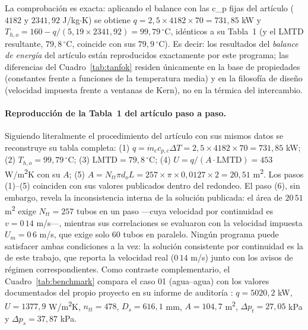 \documentclass[11pt,a4paper]{article}
\begin{document}
La comprobaci\'on es exacta: aplicando el balance con las c\_p fijas
del art\'iculo ($4182$ y $2341{,}92$ J/kg$\cdot$K) se obtiene
$q = 2{,}5\times 4182\times 70 = 731{,}85$ kW y
$T_{h,o} = 160 - q/(5{,}19\times 2341{,}92) = 99{,}79\,^{\circ}$C,
id\'enticos a su Tabla~1 (y el LMTD resultante, $79{,}8\,^{\circ}$C,
coincide con sus $79{,}9\,^{\circ}$C). Es decir: los resultados del
\emph{balance de energ\'ia} del art\'iculo est\'an reproducidos
exactamente por este programa; las diferencias del Cuadro~\ref{tab:tanfok}
residen \'unicamente en la base de propiedades (constantes frente a
funciones de la temperatura media) y en la filosof\'ia de dise\~no
(velocidad impuesta frente a ventanas de Kern), no en la t\'ermica del
intercambio.

\paragraph{Reproducci\'on de la Tabla~1 del art\'iculo paso a paso.}
Siguiendo literalmente el procedimiento del art\'iculo con sus mismos
datos se reconstruye su tabla completa: (1) $q = \dot m_c c_{p,c}\Delta T = 2{,}5\times 4182\times 70 = 731{,}85$ kW; (2) $T_{h,o} = 99{,}79\,^{\circ}$C; (3) $\mathrm{LMTD} = 79{,}8\,^{\circ}$C; (4) $U = q/(A\cdot\mathrm{LMTD}) = 453$ W/m\textsuperscript{2}K con su $A$; (5) $A = N_{tt}\pi d_o L = 257\times \pi\times 0{,}0127\times 2 = 20{,}51$ m\textsuperscript{2}. Los pasos (1)--(5) coinciden con sus valores publicados dentro del redondeo. El paso (6), sin embargo, revela la inconsistencia interna de
la soluci\'on publicada: el \'area de $20\,51$ m\textsuperscript{2} exige
$N_{tt} = 257$ tubos en un paso ---cuya velocidad por continuidad es
$v = 0\,14$ m/s---, mientras sus correlaciones se evaluaron con la
velocidad impuesta $U_m = 0\,6$ m/s, que exige solo 60 tubos en paralelo.
Ning\'un programa puede satisfacer ambas condiciones a la vez: la
soluci\'on consistente por continuidad es la de este trabajo, que
reporta la velocidad real ($0\,14$ m/s) junto con los avisos de
r\'egimen correspondientes. Como
contraste complementario, el Cuadro~\ref{tab:benchmark} compara el caso 01
(agua--agua) con los valores documentados del propio proyecto en su informe
de auditor\'ia \cite{reporte}: $q = 5020{,}2$ kW,
$U = 1377{,}9$ W/m\textsuperscript{2}K,
$n_{tt} = 478$, $D_s = 616{,}1$ mm, $A = 104{,}7$ m\textsuperscript{2},
$\Delta p_t = 27{,}05$ kPa y $\Delta p_s = 37{,}87$ kPa.
\end{document}
